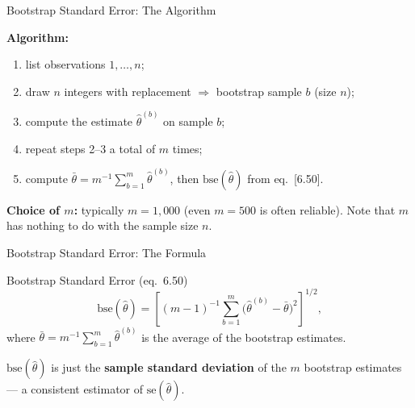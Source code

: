 \documentclass[aspectratio=169, 12pt]{beamer}
\begin{document}
\begin{frame}{Bootstrap Standard Error: The Algorithm}

  \textbf{Algorithm:}
  \begin{enumerate}
    \item list observations $1, \ldots, n$;
    \item draw $n$ integers with replacement $\Rightarrow$ bootstrap sample $b$ (size $n$);
    \item compute the estimate $\hat{\theta}^{(b)}$ on sample $b$;
    \item repeat steps 2--3 a total of $m$ times;
    \item compute $\bar{\theta} = m^{-1}\sum_{b=1}^m \hat{\theta}^{(b)}$, then
      $\text{bse}(\hat{\theta})$ from eq.\ [6.50].
  \end{enumerate}

  \medskip

  \begin{keybox}
    \textbf{Choice of $m$:} typically $m = 1{,}000$ (even $m = 500$ is often reliable).
    Note that $m$ has nothing to do with the sample size $n$.
  \end{keybox}

\end{frame}

\begin{frame}{Bootstrap Standard Error: The Formula}

  \begin{definitionbox}{Bootstrap Standard Error (eq.\ 6.50)}
    \[
      \text{bse}(\hat{\theta}) = \left[
        (m-1)^{-1} \sum_{b=1}^{m}
        \bigl(\hat{\theta}^{(b)} - \bar{\theta}\bigr)^2
      \right]^{1/2},
    \]
    where $\bar{\theta} = m^{-1}\sum_{b=1}^m \hat{\theta}^{(b)}$ is the average of the
    bootstrap estimates.
  \end{definitionbox}

  \medskip

  \begin{highlightbox}
    $\text{bse}(\hat{\theta})$ is just the \textbf{sample standard deviation} of the $m$
    bootstrap estimates --- a consistent estimator of $\text{se}(\hat{\theta})$.
  \end{highlightbox}

\end{frame}
\end{document}
